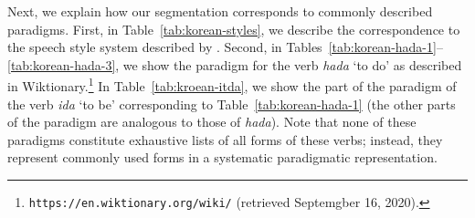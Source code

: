 Next, we explain how our segmentation corresponds to commonly described paradigms.
First, in Table~\ref{tab:korean-styles}, we describe the correspondence to the speech style system described by \citep[4.3.2]{yeon2010korean}.
Second, in Tables~\ref{tab:korean-hada-1}--\ref{tab:korean-hada-3}, we show the paradigm for the verb  \textit{hada} `to do' as described in Wiktionary.\footnote{ \texttt{https://en.wiktionary.org/wiki/} (retrieved Septemgber 16, 2020).}
In Table~\ref{tab:kroean-itda}, we show the part of the paradigm of the verb \textit{ida} `to be' corresponding to Table~\ref{tab:korean-hada-1} (the other parts of the paradigm are analogous to those of \textit{hada}).
Note that none of these paradigms constitute exhaustive lists of all forms of these verbs; instead, they represent commonly used forms in a systematic paradigmatic representation.


